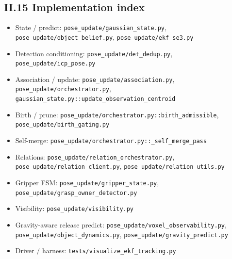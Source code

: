 \documentclass[11pt]{article}
\newcommand{\file}[1]{\texttt{#1}}
\begin{document}
\subsection*{II.15 Implementation index}
\begin{itemize}
\item State / predict: \file{pose\_update/gaussian\_state.py}, \file{pose\_update/object\_belief.py}, \file{pose\_update/ekf\_se3.py}
\item Detection conditioning: \file{pose\_update/det\_dedup.py}, \file{pose\_update/icp\_pose.py}
\item Association / update: \file{pose\_update/association.py}, \file{pose\_update/orchestrator.py}, \file{gaussian\_state.py::update\_observation\_centroid}
\item Birth / prune: \file{pose\_update/orchestrator.py::birth\_admissible}, \file{pose\_update/birth\_gating.py}
\item Self-merge: \file{pose\_update/orchestrator.py::\_self\_merge\_pass}
\item Relations: \file{pose\_update/relation\_orchestrator.py}, \file{pose\_update/relation\_client.py}, \file{pose\_update/relation\_utils.py}
\item Gripper FSM: \file{pose\_update/gripper\_state.py}, \file{pose\_update/grasp\_owner\_detector.py}
\item Visibility: \file{pose\_update/visibility.py}
\item Gravity-aware release predict: \file{pose\_update/voxel\_observability.py}, \file{pose\_update/object\_dynamics.py}, \file{pose\_update/gravity\_predict.py}
\item Driver / harness: \file{tests/visualize\_ekf\_tracking.py}
\end{itemize}
\end{document}
